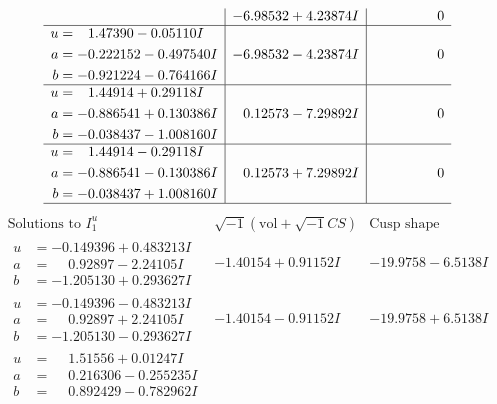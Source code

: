 \documentclass[1p]{elsarticle_modified}
\theoremstyle{definition}
\newcommand{\I}{\sqrt{-1}}
\begin{document}
$$\begin{array}{c|c|c}
 & -6.98532 + 4.23874 I & \phantom{-0.000000 } 0 \\ \hline\begin{aligned}
u &= \phantom{-}1.47390 - 0.05110 I \\
a &= -0.222152 - 0.497540 I \\
b &= -0.921224 - 0.764166 I\end{aligned}
 & -6.98532 - 4.23874 I & \phantom{-0.000000 } 0 \\ \hline\begin{aligned}
u &= \phantom{-}1.44914 + 0.29118 I \\
a &= -0.886541 + 0.130386 I \\
b &= -0.038437 - 1.008160 I\end{aligned}
 & \phantom{-}0.12573 - 7.29892 I & \phantom{-0.000000 } 0 \\ \hline\begin{aligned}
u &= \phantom{-}1.44914 - 0.29118 I \\
a &= -0.886541 - 0.130386 I \\
b &= -0.038437 + 1.008160 I\end{aligned}
 & \phantom{-}0.12573 + 7.29892 I & \phantom{-0.000000 } 0\\
 \hline 
 \end{array}$$\newpage$$\begin{array}{c|c|c}  
\text{Solutions to }I^u_{1}& \I (\text{vol} + \sqrt{-1}CS) & \text{Cusp shape}\\
 \hline 
\begin{aligned}
u &= -0.149396 + 0.483213 I \\
a &= \phantom{-}0.92897 - 2.24105 I \\
b &= -1.205130 + 0.293627 I\end{aligned}
 & -1.40154 + 0.91152 I & -19.9758 - 6.5138 I \\ \hline\begin{aligned}
u &= -0.149396 - 0.483213 I \\
a &= \phantom{-}0.92897 + 2.24105 I \\
b &= -1.205130 - 0.293627 I\end{aligned}
 & -1.40154 - 0.91152 I & -19.9758 + 6.5138 I \\ \hline\begin{aligned}
u &= \phantom{-}1.51556 + 0.01247 I \\
a &= \phantom{-}0.216306 - 0.255235 I \\
b &= \phantom{-}0.892429 - 0.782962 I\end{aligned}

\end{array}$$
\end{document}
